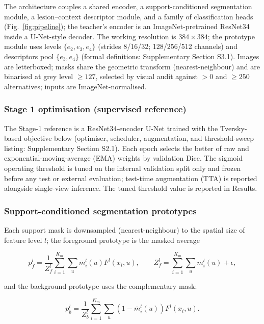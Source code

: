 \documentclass[jimh,article,submit,moreauthors,pdftex]{Definitions/tsp}
\begin{document}
The architecture couples a shared encoder, a support-conditioned
segmentation module, a lesion--context descriptor module, and a family
of classification heads (Fig.~\ref{fig:pipeline}); the teacher's encoder
is an ImageNet-pretrained ResNet34 inside a U-Net-style decoder. The
working resolution is $384\times384$; the prototype module uses levels
$\{e_2, e_3, e_4\}$ (strides 8/16/32; 128/256/512 channels) and
descriptors pool $\{e_3, e_4\}$ (formal definitions: Supplementary
Section S3.1). Images are letterboxed; masks share the geometric
transform (nearest-neighbour) and are binarised at grey level
$\geq 127$, selected by visual audit against $>0$ and $\geq 250$
alternatives; inputs are ImageNet-normalised.

\subsubsection{Stage 1 optimisation (supervised reference)}

The Stage-1 reference is a ResNet34-encoder U-Net trained with the
Tversky-based objective below (optimiser, scheduler, augmentation, and
threshold-sweep listing: Supplementary Section S2.1). Each epoch selects
the better of raw and exponential-moving-average (EMA) weights by
validation Dice. The sigmoid operating threshold is tuned on the
internal validation split only and frozen before any test or external
evaluation; test-time augmentation (TTA) is reported alongside
single-view inference. The tuned threshold value is reported in
Results.

\subsubsection{Support-conditioned segmentation prototypes}

Each support mask is downsampled (nearest-neighbour) to the spatial
size of feature level $l$; the foreground prototype is the masked
average

\begin{equation}
  p_{f}^{l}
  = \frac{1}{Z_f^l}
    \sum_{i=1}^{K_m}\sum_{u}
    \bar{m}_{i}^{l}(u)F^l(x_i,u),
  \qquad
  Z_f^l=\sum_{i=1}^{K_m}\sum_u\bar{m}_{i}^{l}(u)+\epsilon,
  \label{eq:foreground_prototype}
\end{equation}

and the background prototype uses the complementary mask:

\begin{equation}
  p_{b}^{l}
  = \frac{1}{Z_b^l}
    \sum_{i=1}^{K_m}\sum_{u}
    (1-\bar{m}_{i}^{l}(u))F^l(x_i,u).
  \label{eq:background_prototype}
\end{equation}
\end{document}
